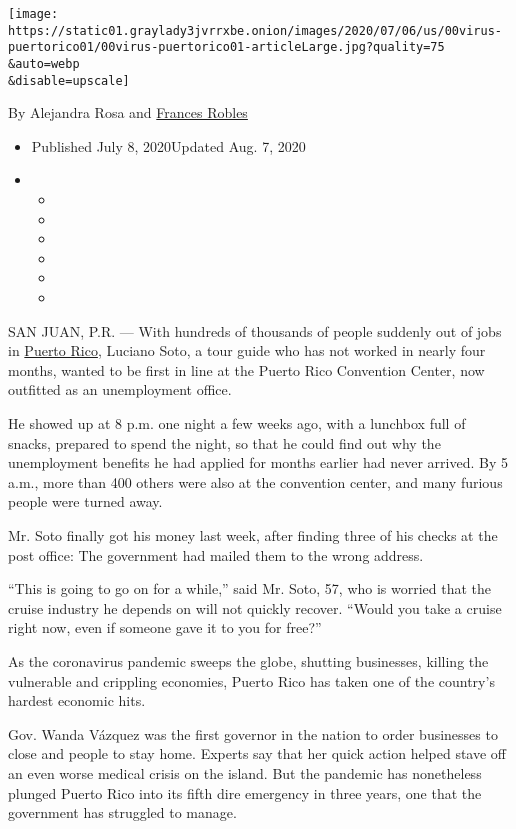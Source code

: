 \texttt{[image: https://static01.graylady3jvrrxbe.onion/images/2020/07/06/us/00virus-puertorico01/00virus-puertorico01-articleLarge.jpg?quality=75\\\&auto=webp\\\&disable=upscale]}

By Alejandra Rosa and
\href{https://www.nytimes3xbfgragh.onion/by/frances-robles}{Frances
Robles}

\begin{itemize}
\item
  Published July 8, 2020Updated Aug. 7, 2020
\item
  \begin{itemize}
  \item
  \item
  \item
  \item
  \item
  \item
  \end{itemize}
\end{itemize}

SAN JUAN, P.R. --- With hundreds of thousands of people suddenly out of
jobs in
\href{https://www.nytimes3xbfgragh.onion/2020/08/07/us/puerto-rico-earthquake.html}{Puerto
Rico}, Luciano Soto, a tour guide who has not worked in nearly four
months, wanted to be first in line at the Puerto Rico Convention Center,
now outfitted as an unemployment office.

He showed up at 8 p.m. one night a few weeks ago, with a lunchbox full
of snacks, prepared to spend the night, so that he could find out why
the unemployment benefits he had applied for months earlier had never
arrived. By 5 a.m., more than 400 others were also at the convention
center, and many furious people were turned away.

Mr. Soto finally got his money last week, after finding three of his
checks at the post office: The government had mailed them to the wrong
address.

``This is going to go on for a while,'' said Mr. Soto, 57, who is
worried that the cruise industry he depends on will not quickly recover.
``Would you take a cruise right now, even if someone gave it to you for
free?''

As the coronavirus pandemic sweeps the globe, shutting businesses,
killing the vulnerable and crippling economies, Puerto Rico has taken
one of the country's hardest economic hits.

Gov. Wanda Vázquez was the first governor in the nation to order
businesses to close and people to stay home. Experts say that her quick
action helped stave off an even worse medical crisis on the island. But
the pandemic has nonetheless plunged Puerto Rico into its fifth dire
emergency in three years, one that the government has struggled to
manage.

